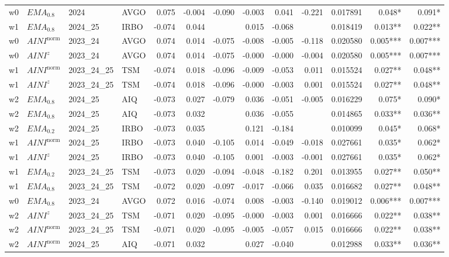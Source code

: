 \begin{longtable}{@{}llllrrrrrrrrr@{}}
w0 & $EMA_{0.8}$ & 2024 & AVGO & 0.075 & -0.004 & -0.090 & -0.003 & 0.041 & -0.221 & 0.017891 & 0.048* & 0.091* \\
w1 & $EMA_{0.8}$ & 2024\_25 & IRBO & -0.074 & 0.044 &  & 0.015 & -0.068 &  & 0.018419 & 0.013** & 0.022** \\
w0 & $AINI^{\mathrm{norm}}$ & 2023\_24 & AVGO & 0.074 & 0.014 & -0.075 & -0.008 & -0.005 & -0.118 & 0.020580 & 0.005*** & 0.007*** \\
w0 & $AINI^{z}$ & 2023\_24 & AVGO & 0.074 & 0.014 & -0.075 & -0.000 & -0.000 & -0.004 & 0.020580 & 0.005*** & 0.007*** \\
w1 & $AINI^{\mathrm{norm}}$ & 2023\_24\_25 & TSM & -0.074 & 0.018 & -0.096 & -0.009 & -0.053 & 0.011 & 0.015524 & 0.027** & 0.048** \\
w1 & $AINI^{z}$ & 2023\_24\_25 & TSM & -0.074 & 0.018 & -0.096 & -0.000 & -0.003 & 0.001 & 0.015524 & 0.027** & 0.048** \\
w2 & $EMA_{0.8}$ & 2024\_25 & AIQ & -0.073 & 0.027 & -0.079 & 0.036 & -0.051 & -0.005 & 0.016229 & 0.075* & 0.090* \\
w2 & $EMA_{0.8}$ & 2024\_25 & AIQ & -0.073 & 0.032 &  & 0.036 & -0.055 &  & 0.014865 & 0.033** & 0.036** \\
w2 & $EMA_{0.2}$ & 2024\_25 & IRBO & -0.073 & 0.035 &  & 0.121 & -0.184 &  & 0.010099 & 0.045* & 0.068* \\
w1 & $AINI^{\mathrm{norm}}$ & 2024\_25 & IRBO & -0.073 & 0.040 & -0.105 & 0.014 & -0.049 & -0.018 & 0.027661 & 0.035* & 0.062* \\
w1 & $AINI^{z}$ & 2024\_25 & IRBO & -0.073 & 0.040 & -0.105 & 0.001 & -0.003 & -0.001 & 0.027661 & 0.035* & 0.062* \\
w1 & $EMA_{0.2}$ & 2023\_24\_25 & TSM & -0.073 & 0.020 & -0.094 & -0.048 & -0.182 & 0.201 & 0.013955 & 0.027** & 0.050** \\
w1 & $EMA_{0.8}$ & 2023\_24\_25 & TSM & -0.072 & 0.020 & -0.097 & -0.017 & -0.066 & 0.035 & 0.016682 & 0.027** & 0.048** \\
w0 & $EMA_{0.8}$ & 2023\_24 & AVGO & 0.072 & 0.016 & -0.074 & 0.008 & -0.003 & -0.140 & 0.019012 & 0.006*** & 0.007*** \\
w2 & $AINI^{z}$ & 2023\_24\_25 & TSM & -0.071 & 0.020 & -0.095 & -0.000 & -0.003 & 0.001 & 0.016666 & 0.022** & 0.038** \\
w2 & $AINI^{\mathrm{norm}}$ & 2023\_24\_25 & TSM & -0.071 & 0.020 & -0.095 & -0.005 & -0.057 & 0.015 & 0.016666 & 0.022** & 0.038** \\
w2 & $AINI^{\mathrm{norm}}$ & 2024\_25 & AIQ & -0.071 & 0.032 &  & 0.027 & -0.040 &  & 0.012988 & 0.033** & 0.036** \\

\end{longtable}

